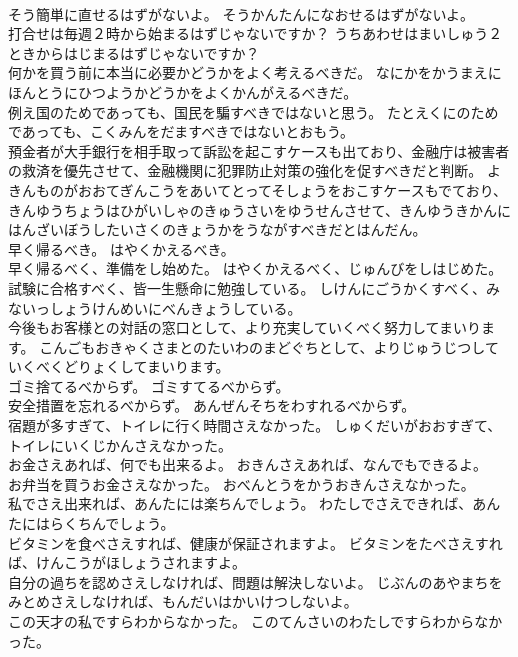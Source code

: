 \documentclass[8pt]{extreport}
\begin{document}
\begin{CJK}{UTF8}{min}
\\	そう簡単に直せるはずがないよ。	そうかんたんになおせるはずがないよ。 
\\	打合せは毎週２時から始まるはずじゃないですか？	うちあわせはまいしゅう２ときからはじまるはずじゃないですか？ 
\\	何かを買う前に本当に必要かどうかをよく考えるべきだ。	なにかをかうまえにほんとうにひつようかどうかをよくかんがえるべきだ。 
\\	例え国のためであっても、国民を騙すべきではないと思う。	たとえくにのためであっても、こくみんをだますべきではないとおもう。 
\\	預金者が大手銀行を相手取って訴訟を起こすケースも出ており、金融庁は被害者の救済を優先させて、金融機関に犯罪防止対策の強化を促すべきだと判断。	よきんものがおおてぎんこうをあいてとってそしょうをおこすケースもでており、きんゆうちょうはひがいしゃのきゅうさいをゆうせんさせて、きんゆうきかんにはんざいぼうしたいさくのきょうかをうながすべきだとはんだん。 
\\	早く帰るべき。	はやくかえるべき。 
\\	早く帰るべく、準備をし始めた。	はやくかえるべく、じゅんびをしはじめた。 
\\	試験に合格すべく、皆一生懸命に勉強している。	しけんにごうかくすべく、みないっしょうけんめいにべんきょうしている。 
\\	今後もお客様との対話の窓口として、より充実していくべく努力してまいります。	こんごもおきゃくさまとのたいわのまどぐちとして、よりじゅうじつしていくべくどりょくしてまいります。 
\\	ゴミ捨てるべからず。	ゴミすてるべからず。 
\\	安全措置を忘れるべからず。	あんぜんそちをわすれるべからず。 
\\	宿題が多すぎて、トイレに行く時間さえなかった。	しゅくだいがおおすぎて、トイレにいくじかんさえなかった。 
\\	お金さえあれば、何でも出来るよ。	おきんさえあれば、なんでもできるよ。 
\\	お弁当を買うお金さえなかった。	おべんとうをかうおきんさえなかった。 
\\	私でさえ出来れば、あんたには楽ちんでしょう。	わたしでさえできれば、あんたにはらくちんでしょう。 
\\	ビタミンを食べさえすれば、健康が保証されますよ。	ビタミンをたべさえすれば、けんこうがほしょうされますよ。 
\\	自分の過ちを認めさえしなければ、問題は解決しないよ。	じぶんのあやまちをみとめさえしなければ、もんだいはかいけつしないよ。 
\\	この天才の私ですらわからなかった。	このてんさいのわたしですらわからなかった。 

\end{CJK}
\end{document}
